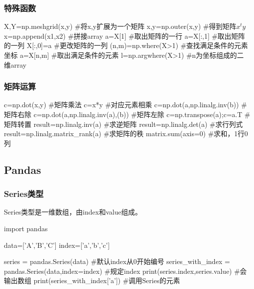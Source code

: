     \subsubsection{特殊函数}  
      \begin{codeblock}[language=python, caption={Advanced operations in numpy}]
        X,Y=np.meshgrid(x,y) #将x,y扩展为一个矩阵
        x,y=np.outer(x,y) #得到矩阵$x^{t}y$
        x=np.append(x1,x2) #拼接array
        a=X[1] #取出矩阵的一行
        a=X[:,1] #取出矩阵的一列
        X[:,0]=a #更改矩阵的一列
        (n,m)=np.where(X>1) #查找满足条件的元素坐标
        a=X[n,m] #取出满足条件的元素
        l=np.argwhere(X>1) #n为坐标组成的二维array
      \end{codeblock}

    \subsubsection{矩阵运算}
      \begin{codeblock}[language=python, caption={calculation of matrix}]
        c=np.dot(x,y) #矩阵乘法
        c=x*y #对应元素相乘
        c=np.dot(a,np.linalg.inv(b)) #矩阵右除
        c=np.dot(a,np.linalg.inv(a),(b)) #矩阵左除
        c=np.transpose(a);c=a.T #矩阵转置
        result=np.linalg.inv(a) #求逆矩阵
        result=np.linalg.det(a) #求行列式
        result=np.linalg.matrix_rank(a) #求矩阵的秩
        matrix.sum(axis=0) #求和，1行0列
      \end{codeblock}

  \subsection{Pandas}
    \subsubsection{Series类型}
      Series类型是一维数组，由index和value组成。
      \begin{codeblock}[language=python, caption={Series in Pandas}]
        import pandas

        data=['A','B','C']
        index=['a','b','c']
        
        series = pandas.Series(data) #默认index从0开始编号
        series_with_index = pandas.Series(data,index=index) #规定index
        print(series.index,series.value) #会输出数组
        print(series_with_index['a']) #调用Series的元素
      \end{codeblock}

